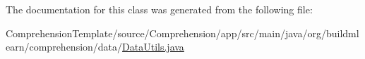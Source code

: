 The documentation for this class was generated from the following file\+:\begin{DoxyCompactItemize}
\item 
Comprehension\+Template/source/\+Comprehension/app/src/main/java/org/buildmlearn/comprehension/data/\hyperlink{ComprehensionTemplate_2source_2Comprehension_2app_2src_2main_2java_2org_2buildmlearn_2comprehension_2data_2DataUtils_8java}{Data\+Utils.\+java}\end{DoxyCompactItemize}

